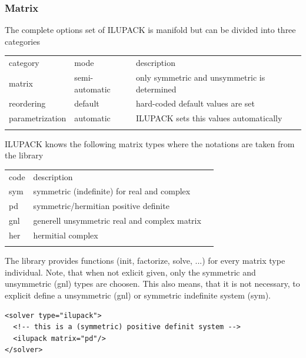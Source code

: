 \subsubsection*{Matrix}
The complete options set of ILUPACK is manifold but can be divided into three categories
\begin{center}
\begin{tabular}{llp{}}
\hline\noalign{\smallskip}
category & mode & description \\
\noalign{\smallskip}\hline\noalign{\smallskip}
matrix & semi-automatic & only symmetric and unsymmetric is determined\\
reordering & default & hard-coded default values are set\\
parametrization & automatic & ILUPACK sets this values automatically\\
\noalign{\smallskip}\hline
\end{tabular}
\end{center}

ILUPACK knows the following matrix types where the notations are taken from the library
\begin{center}
\begin{tabular}{llp{}}
\hline\noalign{\smallskip}
code & description \\
\noalign{\smallskip}\hline\noalign{\smallskip}
sym & symmetric (indefinite) for real and complex \\
pd & symmetric/hermitian positive definite \\
gnl & generell unsymmetric real and complex matrix \\
her & hermitial complex \\
\noalign{\smallskip}\hline
\end{tabular}
\end{center}
The library provides functions (init, factorize, solve, ...) for every matrix type individual. Note, that when not exlicit given, only the symmetric and unsymmetric (gnl) types are choosen. This also means, that it is not necessary, to explicit define a unsymmetric (gnl) or symmetric indefinite system (sym).
\begin{verbatim}
<solver type="ilupack">
  <!-- this is a (symmetric) positive definit system -->
  <ilupack matrix="pd"/>
</solver>
\end{verbatim}

